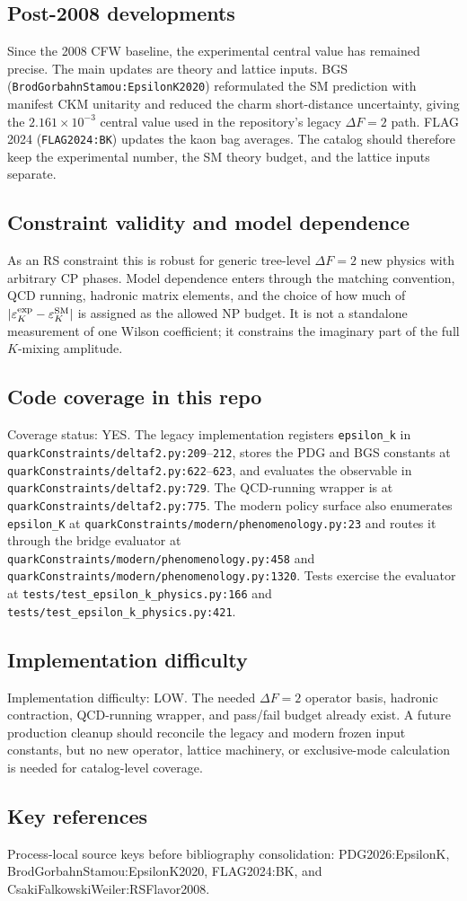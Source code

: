 \subsection*{Post-2008 developments}
Since the 2008 CFW baseline, the experimental central value has remained
precise.  The main updates are theory and lattice inputs.  BGS
(\texttt{BrodGorbahnStamou:EpsilonK2020}) reformulated the SM prediction with
manifest CKM unitarity and reduced the charm short-distance uncertainty,
giving the \(2.161\times10^{-3}\) central value used in the repository's
legacy \(\Delta F=2\) path.  FLAG 2024 (\texttt{FLAG2024:BK}) updates the
kaon bag averages.  The catalog should therefore keep the experimental number,
the SM theory budget, and the lattice inputs separate.

\subsection*{Constraint validity and model dependence}
As an RS constraint this is robust for generic tree-level \(\Delta F=2\)
new physics with arbitrary CP phases.  Model dependence enters through
the matching convention, QCD running, hadronic matrix elements, and the choice
of how much of \(|\varepsilon_K^{\rm exp}-\varepsilon_K^{\rm SM}|\) is assigned as
the allowed NP budget.  It is not a standalone measurement of one Wilson
coefficient; it constrains the imaginary part of the full \(K\)-mixing
amplitude.

\subsection*{Code coverage in this repo}
Coverage status: YES.  The legacy implementation registers
\texttt{epsilon\_k} in
\texttt{quarkConstraints/deltaf2.py:209}--\texttt{212}, stores the PDG and
BGS constants at \texttt{quarkConstraints/deltaf2.py:622}--\texttt{623}, and
evaluates the observable in \texttt{quarkConstraints/deltaf2.py:729}.  The
QCD-running wrapper is at \texttt{quarkConstraints/deltaf2.py:775}.  The
modern policy surface also enumerates \texttt{epsilon\_K} at
\texttt{quarkConstraints/modern/phenomenology.py:23} and routes it through
the bridge evaluator at \texttt{quarkConstraints/modern/phenomenology.py:458}
and \texttt{quarkConstraints/modern/phenomenology.py:1320}.  Tests exercise
the evaluator at \texttt{tests/test\_epsilon\_k\_physics.py:166} and
\texttt{tests/test\_epsilon\_k\_physics.py:421}.

\subsection*{Implementation difficulty}
Implementation difficulty: LOW.  The needed \(\Delta F=2\) operator basis,
hadronic contraction, QCD-running wrapper, and pass/fail budget already exist.
A future production cleanup should reconcile the legacy and modern frozen
input constants, but no new operator, lattice machinery, or exclusive-mode
calculation is needed for catalog-level coverage.

\subsection*{Key references}
Process-local source keys before bibliography consolidation:
PDG2026:EpsilonK, BrodGorbahnStamou:EpsilonK2020, FLAG2024:BK, and
CsakiFalkowskiWeiler:RSFlavor2008.
